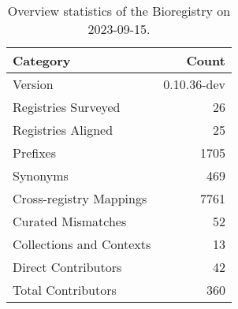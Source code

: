 \begin{table}
\caption{Overview statistics of the Bioregistry on 2023-09-15.}
\label{tab:bioregistry-summary}
\begin{tabular}{lr}
\toprule
Category & Count \\
\midrule
Version & 0.10.36-dev \\
Registries Surveyed & 26 \\
Registries Aligned & 25 \\
Prefixes & 1705 \\
Synonyms & 469 \\
Cross-registry Mappings & 7761 \\
Curated Mismatches & 52 \\
Collections and Contexts & 13 \\
Direct Contributors & 42 \\
Total Contributors & 360 \\
\bottomrule
\end{tabular}
\end{table}
